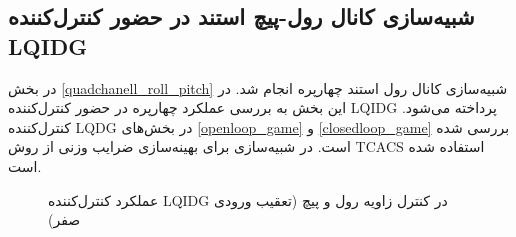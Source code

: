 \subsection{شبیه‌سازی کانال رول-پیچ استند در حضور کنترل‌کننده LQIDG}\label{roll_pitch_lqidg_section}
در بخش
\ref{quadchanell_roll_pitch}
شبیه‌سازی کانال رول استند چهارپره انجام شد. در این بخش به بررسی عملکرد چهارپره در حضور کنترل‌کننده LQIDG پرداخته می‌شود. کنترل‌کننده LQDG در بخش‌های
\ref{openloop_game}
و
\ref{closedloop_game}
بررسی شده است.
 در شبیه‌سازی برای بهینه‌سازی ضرایب وزنی از روش
TCACS \cite{Karimi2010}
استفاده شده است.

\begin{figure}[H]
	\centering
	\caption{‫‪عملکرد کنترل‌کننده LQIDG در کنترل زاویه رول و پیچ (تعقیب ورودی صفر)}
\end{figure}

